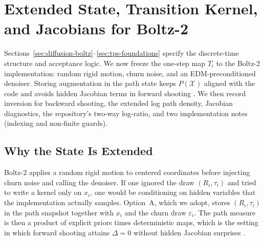 \section{Extended State, Transition Kernel, and Jacobians for Boltz-2}
\label{sec:kernel-full}

Sections~\ref{sec:diffusion-boltz}--\ref{sec:tps-foundations} specify the
discrete-time structure and acceptance logic. We now freeze the one-step map
$T_i$ to the Boltz-2 implementation: random rigid motion, churn noise, and an
EDM-preconditioned denoiser. Storing augmentation in the path state keeps
$P(\mathcal{X})$ aligned with the code and avoids hidden Jacobian terms in
forward shooting \citep{falkner2023}. We then record inversion for backward
shooting, the extended log path density, Jacobian diagnostics, the repository's
two-way log-ratio, and two implementation notes (indexing and non-finite guards).

\subsection{Why the State Is Extended}

Boltz-2 applies a random rigid motion to centered coordinates before injecting churn noise and calling the denoiser. If one ignored the draw $(R_i,\tau_i)$ and tried to write a kernel only on $x_i$, one would be conditioning on hidden variables that the implementation actually samples. Option~A, which we adopt, stores $(R_i,\tau_i)$ in the path snapshot together with $x_i$ and the churn draw $\varepsilon_i$. The path measure is then a product of explicit priors times deterministic maps, which is the setting in which forward shooting attains $\Delta=0$ without hidden Jacobian surprises \citep{falkner2023}.

